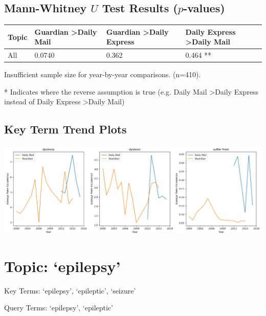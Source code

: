 \documentclass{report}
\begin{document}
\subsection{Mann-Whitney $U$ Test Results ($p$-values)}
\noindent
\begin{tabu} to \textwidth { | X[c] | X[c] | X[c] | X[c] | }  
	\hline
	Topic & Guardian \textgreater\space Daily Mail & Guardian \textgreater\space Daily Express & Daily Express \textgreater\space Daily Mail  \\
	\hline
	All & 0.0740 & 0.362 & 0.464 **  \\
	\hline
\end{tabu}

\noindent Insufficient sample size for year-by-year comparisons. (n=410).

\noindent ** Indicates where the reverse assumption is true (e.g. Daily Mail \textgreater\space Daily Express instead of Daily Express \textgreater\space Daily Mail)

\subsection{Key Term Trend Plots}
\includegraphics[width=\textwidth]{raw/dyslexia-terms.png}

\newpage
\section{Topic: `epilepsy'}
Key Terms: `epilepsy', `epileptic', `seizure'

\noindent Query Terms: `epilepsy', `epileptic'
\end{document}
